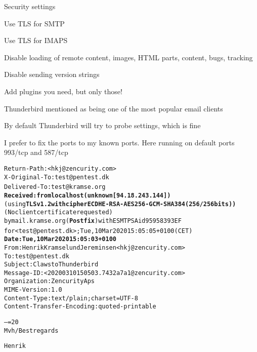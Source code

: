\documentclass[Screen16to9,17pt]{foils}
\begin{document}


\begin{list2}
\item Security settings
\item Use TLS for SMTP
\item Use TLS for IMAPS
\item Disable loading of remote content, images, HTML parts, content, bugs, tracking
\item Disable sending version strings
\item Add plugins you need, but only those!
\end{list2}

Thunderbird mentioned as being one of the most popular email clients



By default Thunderbird will try to probe settings, which is fine



I prefer to fix the ports to my known ports. Here running on default ports 993/tcp and 587/tcp


\begin{alltt}\footnotesize
Return-Path: <hkj@zencurity.com>
X-Original-To: test@pentest.dk
Delivered-To: test@kramse.org{\bf
Received: from localhost (unknown [94.18.243.144])}
	(using {\bf TLSv1.2 with cipher ECDHE-RSA-AES256-GCM-SHA384 (256/256 bits))}
	(No client certificate requested)
	by mail.kramse.org ({\bf Postfix}) with ESMTPSA id 95958393EF
	for <test@pentest.dk>; Tue, 10 Mar 2020 15:05:05 +0100 (CET){\bf
Date: Tue, 10 Mar 2020 15:05:03 +0100}
From: Henrik Kramselund Jereminsen <hkj@zencurity.com>
To: test@pentest.dk
Subject: Claws to Thunderbird
Message-ID: <20200310150503.7432a7a1@zencurity.com>
Organization: Zencurity Aps
MIME-Version: 1.0
Content-Type: text/plain; charset=UTF-8
Content-Transfer-Encoding: quoted-printable

--=20
Mvh/Best regards

Henrik
\end{alltt}

\end{document}
